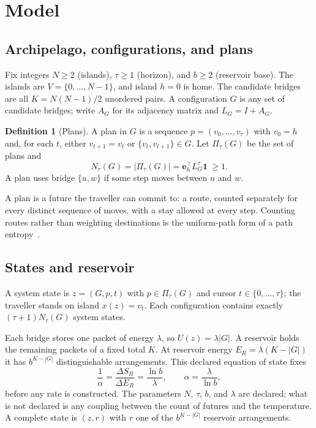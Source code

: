 \documentclass[aps,pre,preprint,superscriptaddress,nofootinbib]{revtex4-2}
\theoremstyle{definition}
\newtheorem{definition}{Definition}
\theoremstyle{remark}
\newcommand{\N}{N_\tau}
\newcommand{\Pl}{\Pi_\tau}
\begin{document}
\section{Model}
\label{sec:model}

\subsection{Archipelago, configurations, and plans}

Fix integers $N\ge2$ (islands), $\tau\ge1$ (horizon), and $b\ge2$ (reservoir base). The islands are $V=\{0,\dots,N-1\}$, and island $h=0$ is home. The candidate bridges are all $K=N(N-1)/2$ unordered pairs. A configuration $G$ is any set of candidate bridges; write $A_G$ for its adjacency matrix and $L_G=I+A_G$.

\begin{definition}[Plans]
A plan in $G$ is a sequence $p=(v_0,\dots,v_\tau)$ with $v_0=h$ and, for each $t$, either $v_{t+1}=v_t$ or $\{v_t,v_{t+1}\}\in G$. Let $\Pl(G)$ be the set of plans and
\begin{equation}
  \N(G)=|\Pl(G)|=\mathbf e_h^{\top}L_G^{\tau}\mathbf 1\ \ge 1 .
  \label{eq:count}
\end{equation}
A plan uses bridge $\{u,w\}$ if some step moves between $u$ and $w$.
\end{definition}

A plan is a future the traveller can commit to: a route, counted separately for every distinct sequence of moves, with a stay allowed at every step. Counting routes rather than weighting destinations is the uniform-path form of a path entropy~\cite{WissnerGross2013,Presse2013}.

\subsection{States and reservoir}

A system state is $z=(G,p,t)$ with $p\in\Pl(G)$ and cursor $t\in\{0,\dots,\tau\}$; the traveller stands on island $x(z)=v_t$. Each configuration contains exactly $(\tau+1)\N(G)$ system states.

Each bridge stores one packet of energy $\lambda$, so $U(z)=\lambda|G|$. A reservoir holds the remaining packets of a fixed total $K$. At reservoir energy $E_R=\lambda(K-|G|)$ it has $b^{K-|G|}$ distinguishable arrangements. This declared equation of state fixes
\begin{equation}
  \frac1\alpha=\frac{\Delta S_R}{\Delta E_R}=\frac{\ln b}{\lambda},\qquad \alpha=\frac{\lambda}{\ln b},
\end{equation}
before any rate is constructed. The parameters $N$, $\tau$, $b$, and $\lambda$ are declared; what is not declared is any coupling between the count of futures and the temperature. A complete state is $(z,r)$ with $r$ one of the $b^{K-|G|}$ reservoir arrangements.
\end{document}
